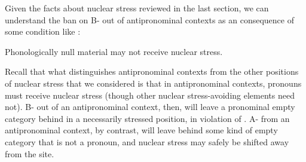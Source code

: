 \documentclass[output=paper]{LSP/langsci}
\begin{document}
  Given the facts about nuclear stress reviewed in the last section, we can understand the ban on B- out of antipronominal contexts as an consequence of some condition like :


\ea%
    \label{ex:richards:25bis}
  	  Phonologically null material may not receive nuclear stress.
\z


Recall that what distinguishes antipronominal contexts from the other positions of nuclear stress that we considered is that in antipronominal contexts, pronouns must receive nuclear stress (though other nuclear stress-avoiding elements need not).  B- out of an antipronominal context, then, will leave a pronominal empty category behind in a necessarily stressed position, in violation of .  A- from an antipronominal context, by contrast, will leave behind some kind of empty category that is not a pronoun, and nuclear stress may safely be shifted away from the  site.  
\end{document}
